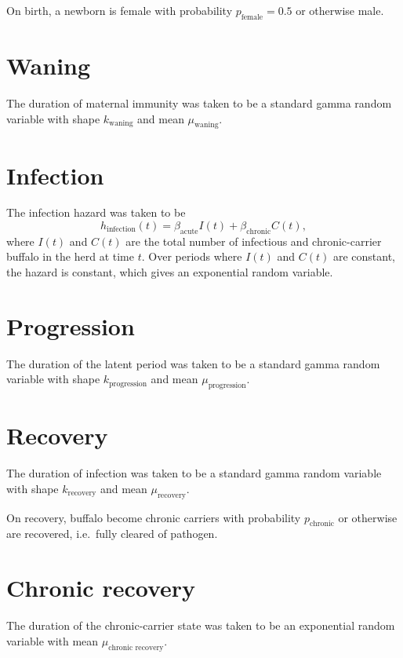 \documentclass[12pt]{article}
\begin{document}
On birth, a newborn is female with probability
$p_{\text{female}} = 0.5$ or otherwise male.


\section{Waning}

The duration of maternal immunity was taken to be a standard gamma
random variable with shape $k_{\text{waning}}$
and mean $\mu_{\text{waning}}$.


\section{Infection}

The infection hazard was taken to be
\begin{equation}
  h_{\text{infection}}(t) = \beta_{\text{acute}} I(t) +
  \beta_{\text{chronic}} C(t),
\end{equation}
where $I(t)$ and $C(t)$ are the total number of infectious and
chronic-carrier buffalo in the herd at time $t$.  Over periods where
$I(t)$ and $C(t)$ are constant, the hazard is constant, which gives an
exponential random variable.


\section{Progression}

The duration of the latent period was taken to be a standard gamma
random variable with shape $k_{\text{progression}}$
and mean $\mu_{\text{progression}}$.


\section{Recovery}

The duration of infection was taken to be a standard gamma random
variable with shape $k_{\text{recovery}}$ and mean
$\mu_{\text{recovery}}$.

On recovery, buffalo become chronic carriers with probability
$p_{\text{chronic}}$ or otherwise are recovered, i.e.~fully cleared
of pathogen.


\section{Chronic recovery}

The duration of the chronic-carrier state was taken to be an
exponential random variable with mean
$\mu_{\text{chronic recovery}}$.
\end{document}
